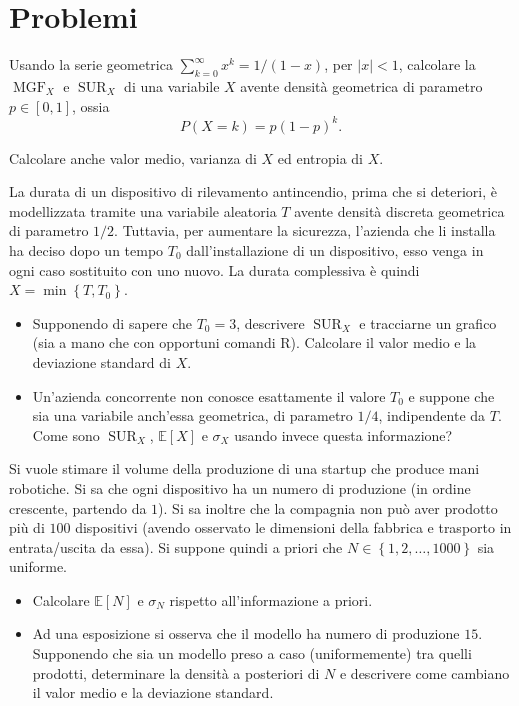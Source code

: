 \documentclass[
  italian,
  letterpaper,
]{book}
\providecommand{\tightlist}{%
  \setlength{\itemsep}{0pt}\setlength{\parskip}{0pt}}
\newcommand{\sqa}[1]{\left[ #1 \right]}
\newcommand{\cur}[1]{\left\{ #1 \right\}}
\newcommand{\E}[1]{\mathbb{E}\sqa{#1}}
\newcommand{\SUR}{\operatorname{SUR}}
\newcommand{\MGF}{\operatorname{MGF}}
\theoremstyle{definition}
\theoremstyle{remark}
\begin{document}
\section{Problemi}\label{problemi-2}

Usando la serie geometrica \(\sum_{k=0}^\infty x^k = 1/(1-x)\), per
\(|x|<1\), calcolare la \(\MGF_X\) e \(\SUR_X\) di una variabile \(X\)
avente densità geometrica di parametro \(p \in [0,1]\), ossia
\[ P(X=k) = p (1-p)^k.\]

Calcolare anche valor medio, varianza di \(X\) ed entropia di \(X\).

La durata di un dispositivo di rilevamento antincendio, prima che si
deteriori, è modellizzata tramite una variabile aleatoria \(T\) avente
densità discreta geometrica di parametro \(1/2\). Tuttavia, per
aumentare la sicurezza, l'azienda che li installa ha deciso dopo un
tempo \(T_0\) dall'installazione di un dispositivo, esso venga in ogni
caso sostituito con uno nuovo. La durata complessiva è quindi
\(X = \min\cur{T, T_0}\).

\begin{itemize}
\tightlist
\item
  Supponendo di sapere che \(T_0=3\), descrivere \(\SUR_{X}\) e
  tracciarne un grafico (sia a mano che con opportuni comandi R).
  Calcolare il valor medio e la deviazione standard di \(X\).
\item
  Un'azienda concorrente non conosce esattamente il valore \(T_0\) e
  suppone che sia una variabile anch'essa geometrica, di parametro
  \(1/4\), indipendente da \(T\). Come sono \(\SUR_X\), \(\E{X}\) e
  \(\sigma_X\) usando invece questa informazione?
\end{itemize}

Si vuole stimare il volume della produzione di una startup che produce
mani robotiche. Si sa che ogni dispositivo ha un numero di produzione
(in ordine crescente, partendo da \(1\)). Si sa inoltre che la compagnia
non può aver prodotto più di \(100\) dispositivi (avendo osservato le
dimensioni della fabbrica e trasporto in entrata/uscita da essa). Si
suppone quindi a priori che \(N \in \cur{1, 2, \ldots, 1000}\) sia
uniforme.

\begin{itemize}
\tightlist
\item
  Calcolare \(\E{N}\) e \(\sigma_N\) rispetto all'informazione a priori.
\item
  Ad una esposizione si osserva che il modello ha numero di produzione
  \(15\). Supponendo che sia un modello preso a caso (uniformemente) tra
  quelli prodotti, determinare la densità a posteriori di \(N\) e
  descrivere come cambiano il valor medio e la deviazione standard.
\end{itemize}
\end{document}
